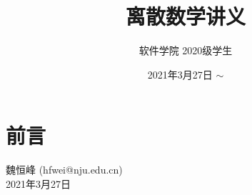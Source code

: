 \documentclass[cn,11pt,chinese]{elegantbook}
\title{离散数学讲义}
\author{软件学院 2020级学生}
\institute{南京大学}
\date{2021年3月27日 $\sim$ \zhtoday}
\begin{document}
\maketitle
\frontmatter

\chapter*{前言}

\vskip 1.5cm
\begin{flushright}
  魏恒峰 (hfwei@nju.edu.cn) \\
  2021年3月27日
\end{flushright}

\tableofcontents
\mainmatter





\end{document}
